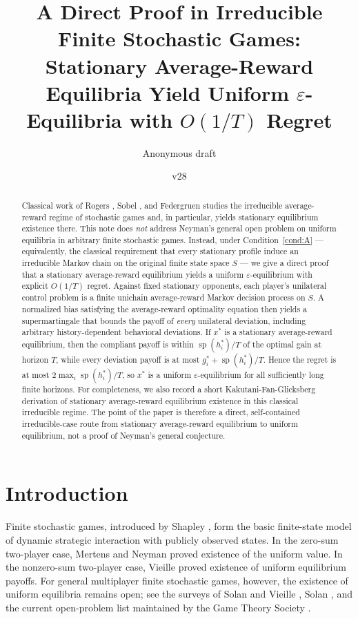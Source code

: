 \documentclass[11pt]{article}
\title{A Direct Proof in Irreducible Finite Stochastic Games:\\Stationary Average-Reward Equilibria Yield Uniform $\varepsilon$-Equilibria with $O(1/T)$ Regret}
\author{Anonymous draft}
\date{v28}
\theoremstyle{definition}
\newcommand{\1}{\mathbf{1}}
\DeclareMathOperator{\spn}{sp}
\begin{document}
\maketitle

\begin{abstract}
Classical work of Rogers \cite{Rogers1969}, Sobel \cite{Sobel1971}, and Federgruen \cite{Federgruen1978} studies the irreducible average-reward regime of stochastic games and, in particular, yields stationary equilibrium existence there. This note does \emph{not} address Neyman's general open problem on uniform equilibria in arbitrary finite stochastic games. Instead, under Condition~\ref{cond:A} --- equivalently, the classical requirement that every stationary profile induce an irreducible Markov chain on the original finite state space $S$ --- we give a direct proof that a stationary average-reward equilibrium yields a uniform $\varepsilon$-equilibrium with explicit $O(1/T)$ regret. Against fixed stationary opponents, each player's unilateral control problem is a finite unichain average-reward Markov decision process on $S$. A normalized bias satisfying the average-reward optimality equation then yields a supermartingale that bounds the payoff of \emph{every} unilateral deviation, including arbitrary history-dependent behavioral deviations. If $x^*$ is a stationary average-reward equilibrium, then the compliant payoff is within $\spn(h_i^*)/T$ of the optimal gain at horizon $T$, while every deviation payoff is at most $g_i^*+\spn(h_i^*)/T$. Hence the regret is at most $2\max_i \spn(h_i^*)/T$, so $x^*$ is a uniform $\varepsilon$-equilibrium for all sufficiently long finite horizons. For completeness, we also record a short Kakutani-Fan-Glicksberg derivation of stationary average-reward equilibrium existence in this classical irreducible regime. The point of the paper is therefore a direct, self-contained irreducible-case route from stationary average-reward equilibrium to uniform equilibrium, not a proof of Neyman's general conjecture.
\end{abstract}

\section{Introduction}

Finite stochastic games, introduced by Shapley \cite{Shapley1953}, form the basic finite-state model of dynamic strategic interaction with publicly observed states. In the zero-sum two-player case, Mertens and Neyman \cite{MertensNeyman1981} proved existence of the uniform value. In the nonzero-sum two-player case, Vieille \cite{Vieille2000a,Vieille2000b} proved existence of uniform equilibrium payoffs. For general multiplayer finite stochastic games, however, the existence of uniform equilibria remains open; see the surveys of Solan and Vieille \cite{SolanVieille2015}, Solan \cite{Solan2022}, and the current open-problem list maintained by the Game Theory Society \cite{OpenProblems2026}.
\end{document}
